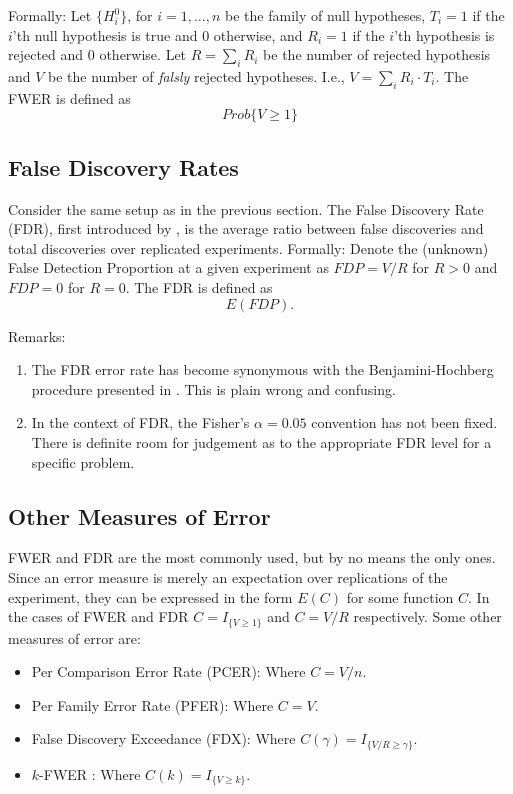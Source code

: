 \documentclass[draft,12pt]{article}
\begin{document}
Formally: Let $ \{ H^0_i \} $, for $i=1,\ldots,n$ be the family of null hypotheses, $T_i=1$ if the $i$'th null hypothesis is true and 0 otherwise,  and $R_i=1$ if the $i$'th hypothesis is rejected and 0 otherwise.
Let $R=\sum_i{R_i}$ be the number of rejected hypothesis and $V$ be the number of \emph{falsly} rejected hypotheses. I.e., $V=\sum_i{R_i \cdot T_i}$.
The FWER is defined as $$Prob\{V \geq1  \}$$

\subsection{\label{sub:fdr}False Discovery Rates}
Consider the same setup as in the previous section. The False Discovery Rate (FDR), first introduced by \citet{benjamini_controlling_1995}, is the average ratio between false discoveries and total discoveries over replicated experiments.
Formally:  Denote the (unknown) False Detection Proportion at a given experiment as $FDP=V/R$ for $R>0$ and $FDP=0$ for $R=0$.  
The FDR is defined as $$E \left( FDP \right).$$

Remarks:
\begin{enumerate}
\item The FDR error rate has become synonymous with the Benjamini-Hochberg procedure presented in \citep{benjamini_controlling_1995} . This is plain wrong and confusing. 
\item In the context of FDR, the Fisher's $\alpha=0.05$ convention has not been fixed. There is definite room for judgement as to the appropriate FDR level for a specific problem.
\end{enumerate}




\subsection{Other Measures of Error}
FWER and FDR are the most commonly used, but by no means the only ones. Since an error measure is merely an expectation over replications of the experiment, they can be expressed in the form $E(C)$ for some function $C$. In the cases of FWER and FDR $C = I_{\{ V \geq 1 \} } $ and $C = V/R$ respectively.
Some other measures of error are:

\begin{itemize}
\item Per Comparison Error Rate (PCER): Where $C=V/n$.
\item Per Family Error Rate (PFER): Where $C=V$.
\item False Discovery Exceedance (FDX)\citep{genovese_exceedance_2006}: Where $C(\gamma) = I_{\{ V/R \geq \gamma \} }$.
\item $k$-FWER \citep{van_der_laan_augmentation_2004}: Where $C(k) = I_{\{ V \geq k \} }$.
\end{itemize}
\end{document}
